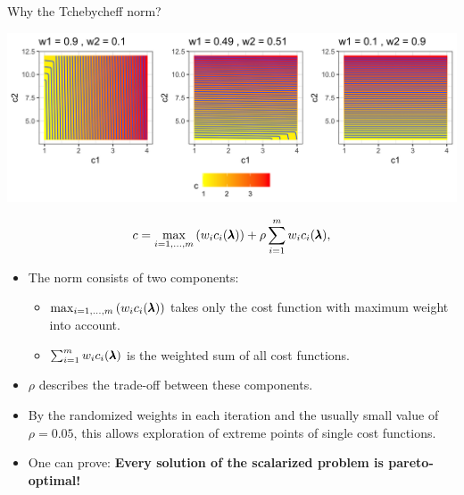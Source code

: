 \begin{frame}{Why the Tchebycheff norm?}

    \begin{center}
        \includegraphics[scale=0.08]{images/parego_viz}
    \end{center}
    $$
    c = \max_{i=1,\dots,m}\left(w_i c_i(\pmb{\lambda})\right) + \rho \sum_{i=1}^m w_ic_i(\pmb{\lambda}),
    $$
    \begin{itemize}
        \item The norm consists of two components:
            \begin{itemize}
                    \item $\max_{i=1,\dots,m}\left(w_i c_i(\pmb{\lambda})\right)$ takes only the cost function with maximum weight into account.
                    \item $\sum_{i=1}^m w_ic_i(\pmb{\lambda})$ is the weighted sum of all cost functions.
            \end{itemize}
        \item $\rho$ describes the trade-off between these components.
        \item By the randomized weights in each iteration and the usually small value of $\rho = 0.05$, this allows exploration of extreme points of single cost functions.
        \item One can prove: \textbf{Every solution of the scalarized problem is pareto-optimal!}
    \end{itemize}
\end{frame}

